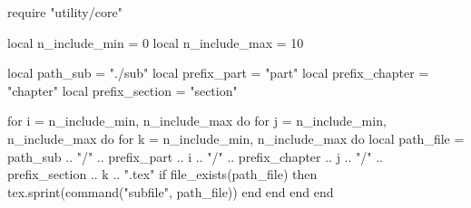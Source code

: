 \documentclass[11pt, a4paper]{ltjsbook}
\date{\today}
\title{}
\author{}
\begin{document}
\maketitle
\tableofcontents

\begin{luacode*}
    require "utility/core"

    local n_include_min = 0
    local n_include_max = 10

    local path_sub = "./sub"
    local prefix_part = "part"
    local prefix_chapter = "chapter"
    local prefix_section = "section"

    for i = n_include_min, n_include_max do
        for j = n_include_min, n_include_max do
            for k = n_include_min, n_include_max do
                local path_file = path_sub .. "/" .. prefix_part .. i .. "/" .. prefix_chapter .. j .. "/" .. prefix_section .. k .. ".tex"
                if file_exists(path_file) then
                    tex.sprint(command("subfile", path_file))
                end
            end
        end
    end
\end{luacode*}



\end{document}
